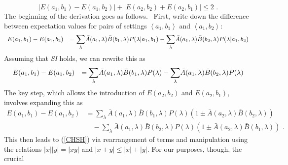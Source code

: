 \documentclass[12pt]{article}%
\begin{document}
\begin{equation}
\left\vert E(a_{1},b_{1})-E(a_{1},b_{2})\right\vert +\left\vert E(a_{2}%
,b_{2})+E(a_{2},b_{1})\right\vert \leq2\text{ .} \label{CHSH}%
\end{equation}
The beginning of the derivation goes as follows. \ First, write down the
difference between expectation values for pairs of settings $\left\langle
a_{1},b_{1}\right\rangle $ and $\left\langle a_{1},b_{2}\right\rangle :$%
\begin{equation}%
\begin{array}
[c]{ll}%
E(a_{1},b_{1})-E(a_{1},b_{2}) & =%
{\displaystyle\sum\limits_{\lambda}}
\bar{A}(a_{1},\lambda)\bar{B}(b_{1},\lambda)P(\lambda|a_{1},b_{1})-%
{\displaystyle\sum\limits_{\lambda}}
\bar{A}(a_{1},\lambda)\bar{B}(b_{2},\lambda)P(\lambda|a_{1},b_{2})
\end{array}
\label{CHSH1}%
\end{equation}
Assuming that \emph{SI} holds, we can rewrite this as%
\begin{equation}%
\begin{array}
[c]{ll}%
E(a_{1},b_{1})-E(a_{1},b_{2}) & =%
{\displaystyle\sum\limits_{\lambda}}
\bar{A}(a_{1},\lambda)\bar{B}(b_{1},\lambda)P(\lambda)-%
{\displaystyle\sum\limits_{\lambda}}
\bar{A}(a_{1},\lambda)\bar{B}(b_{2},\lambda)P(\lambda)
\end{array}
\label{CHSH1a}%
\end{equation}
The key step, which allows the introduction of $E(a_{2},b_{2})$ and
$E(a_{2},b_{1})$, involves expanding this as
\begin{align}
E(a_{1},b_{1})-E(a_{1},b_{2}) &=
{\displaystyle\sum\limits_{\lambda}}
\bar{A}(a_{1},\lambda)\bar{B}(b_{1},\lambda)P(\lambda)(1\pm\bar{A}%
(a_{2},\lambda)\bar{B}(b_{2},\lambda))\nonumber \\
& \quad - 
{\displaystyle\sum\limits_{\lambda}}
\bar{A}(a_{1},\lambda)\bar{B}(b_{2},\lambda)P(\lambda)(1\pm\bar{A}%
(a_{2},\lambda)\bar{B}(b_{1},\lambda))\text{ .}%
\label{CHSH1b}%
\end{align}
This then leads to (\ref{CHSH}) via rearrangement of terms and manipulation
using the relations $\left\vert x\right\vert \left\vert y\right\vert
=\left\vert xy\right\vert $ and $\left\vert x+y\right\vert \leq\left\vert
x\right\vert +\left\vert y\right\vert $. For our purposes, though, the crucial
\end{document}
